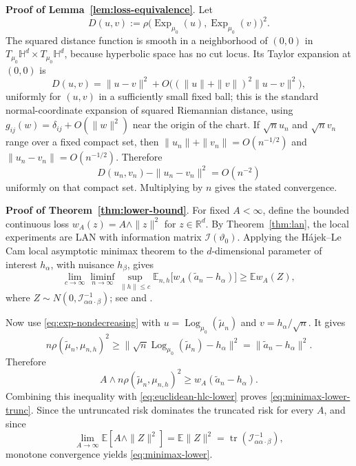 \documentclass[11pt]{article}
\newcommand{\bbR}{\mathbb{R}}
\DeclareMathOperator{\tr}{tr}
\newcommand{\E}{\mathbb{E}}
\newcommand{\Hh}{\mathbb{H}}
\newcommand{\Exp}{\operatorname{Exp}}
\newcommand{\Log}{\operatorname{Log}}
\newcommand{\info}{\mathcal{I}}
\newcommand{\HajekLecam}{H\'ajek--Le Cam\xspace}
\begin{document}
\medskip 
\noindent \textbf{Proof of Lemma~\ref{lem:loss-equivalence}}. Let
\[
D(u,v):=\rho\bigl(\Exp_{\mu_0}(u),\Exp_{\mu_0}(v)\bigr)^2 .
\]
The squared distance function is smooth in a neighborhood of $(0,0)$ in
$T_{\mu_0}\Hh^d\times T_{\mu_0}\Hh^d$, because hyperbolic space has no cut locus. Its Taylor expansion at $(0,0)$ is
\[
D(u,v)=\|u-v\|^2+O\bigl((\|u\|+\|v\|)^2\|u-v\|^2\bigr),
\]
uniformly for $(u,v)$ in a sufficiently small fixed ball; this is the standard normal-coordinate expansion of squared Riemannian distance, using
$g_{ij}(w)=\delta_{ij}+O(\|w\|^2)$ near the origin of the chart. If $\sqrt n u_n$ and $\sqrt n v_n$ range over a fixed compact set, then $\|u_n\|+\|v_n\|=O(n^{-1/2})$ and $\|u_n-v_n\|=O(n^{-1/2})$. Therefore
\[
D(u_n,v_n)-\|u_n-v_n\|^2=O(n^{-2})
\]
uniformly on that compact set. Multiplying by $n$ gives the stated convergence.


\medskip 
\noindent \textbf{Proof of Theorem~\ref{thm:lower-bound}}. For fixed $A<\infty$, define the bounded continuous loss
$
w_A(z)=A\wedge \|z\|^2$ for $z \in \bbR^d$. By Theorem~\ref{thm:lan}, the local experiments are LAN with information matrix $\info(\vartheta_0)$. Applying the \HajekLecam local asymptotic minimax theorem to the $d$-dimensional parameter of interest $h_\alpha$, with nuisance $h_\beta$, gives
\begin{equation}
\label{eq:euclidean-hlc-lower}
\lim_{c\to\infty}\liminf_{n\to\infty}\sup_{\|h\|\le c}
\E_{n,h}\bigl[w_A(\tilde a_n-h_\alpha)\bigr]
\ge
\E w_A(Z),
\end{equation}
where $Z\sim N(0,\info_{\alpha\alpha\cdot\beta}^{-1})$; see \citet{hajek_1972_LocalAsymptoticMinimax} and \citet[Ch.~9]{vandervaart_1998_AsymptoticStatistics}.

Now use \eqref{eq:exp-nondecreasing} with
$u=\Log_{\mu_0}(\tilde\mu_n)$ and $v=h_\alpha/\sqrt n$. It gives
\[
n\rho(\tilde\mu_n,\mu_{n,h})^2
\ge
\|\sqrt n\Log_{\mu_0}(\tilde\mu_n)-h_\alpha\|^2
=
\|\tilde a_n-h_\alpha\|^2.
\]
Therefore
\[
A\wedge n\rho(\tilde\mu_n,\mu_{n,h})^2
\ge
w_A(\tilde a_n-h_\alpha).
\]
Combining this inequality with \eqref{eq:euclidean-hlc-lower} proves \eqref{eq:minimax-lower-trunc}. Since the untruncated risk dominates the truncated risk for every $A$, and since
\[
\lim_{A\to\infty}\E[A\wedge\|Z\|^2]=\E\|Z\|^2=\tr(\info_{\alpha\alpha\cdot\beta}^{-1}),
\]
monotone convergence yields \eqref{eq:minimax-lower}.
\end{document}
